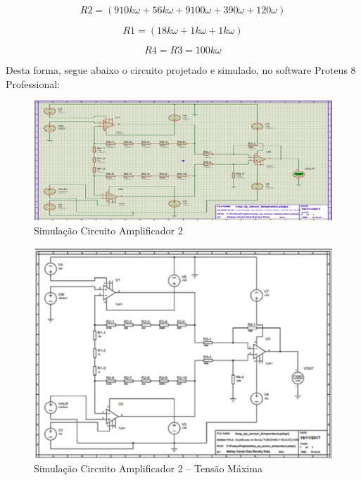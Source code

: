 \begin{equation}\label{eq1tc}
    R2 = (910k\omega + 56k\omega + 9100\omega + 390\omega + 120\omega)
\end{equation}

\begin{equation}\label{eq1tc}
    R1 = (18k\omega + 1k\omega + 1k\omega)
\end{equation}

\begin{equation}\label{eq1tc}
    R4 = R3 = 100k\omega
\end{equation}

Desta forma, segue abaixo o circuito projetado e simulado, no software Proteus 8 Professional:

\begin{figure}[!htb]                  
	\centering                          
	\includegraphics[scale=0.6]{figuras/circ1.eps}
	\caption{ Simulação Circuito Amplificador 2 }  \label{figamp2}           
\end{figure}

\begin{figure}[!htb]                  
	\centering                          
	\includegraphics[scale=0.5]{figuras/circ2.eps}
	\caption{ Simulação Circuito Amplificador 2 – Tensão Máxima } \label{figamp21}                
\end{figure}

